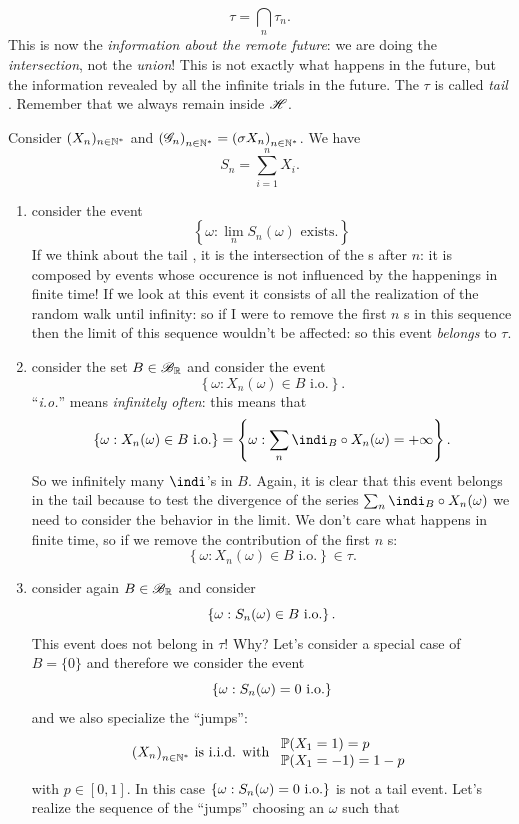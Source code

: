 \documentclass{report}
\begin{document}
\[\tau=\bigcap_n\tau_n.\]
This is now the \textit{information about the remote future}: we are doing the \textit{intersection}, not the \textit{union}! This is not exactly what happens in the future, but the information revealed by all the infinite trials in the future. The \sa{} $\tau$ is called \emph{tail \sa{}}. Remember that we always remain inside $\mathscr{H}$.
\begin{example}
	Consider ${(X_n)_{n\in\mathbb{N}^{*}}}$ and ${(\mathscr{G}_n)}_{n\in\mathbb{N}^{*}}={(\sigma X_n)}_{n\in\mathbb{N}^{*}}$. We have 
	\[S_n=\sum_{i=1}^{n}X_i.\]
	\begin{enumerate}[\circnum]
		\item consider the event
		\[\left\{\omega:\lim_{n}S_n(\omega)\text{ exists.}\right\}\]
		If we think about the tail \sa, it is the intersection of the \sa s after $n$: it is composed by events whose occurence is not influenced by the happenings in finite time! If we look at this event it consists of all the realization of the random walk until infinity: so if I were to remove the first $n$ \rv s in this sequence then the limit of this sequence wouldn't be affected: so this event \textit{belongs} to $\tau$.
		\item consider the set $B\in\mathscr{B}_{\mathbb{R}}$ and consider the event
		\[\left\{\omega :X_n(\omega)\in B\text{ i.o.}\right\}.\]
		``\textit{i.o.}'' means \textit{infinitely often}: this means that
		\[\left\{\omega :X_n(\omega)\in B\text{ i.o.}\right\}=\left\{\omega:\sum_n\indi_B\circ X_n(\omega)=+\infty\right\}.\]
		So we infinitely many $\indi$'s in $B$. Again, it is clear that this event belongs in the tail \sa{} because to test the divergence of the series $\sum_n\indi_B\circ X_n(\omega)$ we need to consider the behavior in the limit. We don't care what happens in finite time, so if we remove the contribution of the first $n$ \rv s:
		\[\left\{\omega :X_n(\omega)\in B\text{ i.o.}\right\}\in\tau.\]
		\item consider again $B\in\mathscr{B}_{\mathbb{R}}$ and consider 
		\[\left\{\omega: S_n(\omega)\in B\text{ i.o.}\right\}.\]
		This event does not belong in $\tau$! Why? Let's consider a special case of $B=\{0\}$ and therefore we consider the event
		\[\left\{\omega:S_n(\omega)=0\text{ i.o.}\right\}\]
		and we also specialize the ``jumps'':
		\[{(X_n)}_{n\in\mathbb{N}^{*}}\text{ is i.i.d. with }\begin{array}{l}
			\mathbb{P}(X_1=1)=p\\
			\mathbb{P}(X_1=-1)=1-p
		\end{array}\]
		with $p\in[0,1]$. In this case $\left\{\omega:S_n(\omega)=0\text{ i.o.}\right\}$ is not a tail event. Let's realize the sequence of the ``jumps'' choosing an $\omega$ such that

\end{enumerate}
\end{example}
\end{document}
